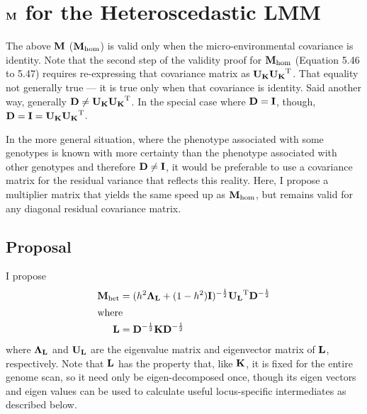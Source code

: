\section{\texorpdfstring{$\mathbf{M}$}{M} for the Heteroscedastic LMM}

The above $\mathbf{M}$ ($\mathbf{M}_\text{hom}$) is valid only when the micro-environmental covariance is identity.
Note that the second step of the validity proof for $\mathbf{M}_{\text{hom}}$ (Equation 5.46 to 5.47) requires re-expressing that covariance matrix as $\mathbf{U_K} \mathbf{U_K}^\mathrm{T}$.
That equality not generally true --- it is true only when that covariance is identity.
Said another way, generally $\mathbf{D} \neq \mathbf{U_K} \mathbf{U_K}^\mathrm{T}$.
In the special case where $\mathbf{D} = \mathbf{I}$, though, $\mathbf{D} = \mathbf{I} = \mathbf{U_K} \mathbf{U_K}^\mathrm{T}$.

In the more general situation, where the phenotype associated with some genotypes is known with more certainty than the phenotype associated with other genotypes and therefore $\mathbf{D} \neq \mathbf{I}$, it would be preferable to use a covariance matrix for the residual variance that reflects this reality.
Here, I propose a multiplier matrix that yields the same speed up as $\mathbf{M}_\text{hom}$, but remains valid for any diagonal residual covariance matrix.

\subsection{Proposal}
I propose
\begin{align}
	\mathbf{M}_\text{het} &= (h^2\mathbf{\Lambda_L} + (1 - h^2) \mathbf{I})^{-\frac{1}{2}}\mathbf{U_L}^\mathrm{T} \mathbf{D}^{-\frac{1}{2}}\\
\shortintertext{where}
	\mathbf{L} &= \mathbf{D}^{-\frac{1}{2}}\mathbf{K} \mathbf{D}^{-\frac{1}{2}}
\end{align}
where $\mathbf{\Lambda_L}$ and $\mathbf{U_L}$ are the eigenvalue matrix and eigenvector matrix of $\mathbf{L}$, respectively.
Note that $\mathbf{L}$ has the property that, like $\mathbf{K}$, it is fixed for the entire genome scan, so it need only be eigen-decomposed once, though its eigen vectors and eigen values can be used to calculate useful locus-specific intermediates as described below.

